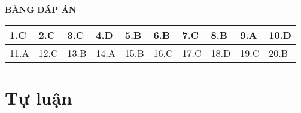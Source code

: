 \whiteBGstarEnd

\loigiai
{
	\begin{center}
		\textbf{BẢNG ĐÁP ÁN}
	\end{center}
	\begin{center}
		\begin{tabular}{|m{2.8em}|m{2.8em}|m{2.8em}|m{2.8em}|m{2.8em}|m{2.8em}|m{2.8em}|m{2.8em}|m{2.8em}|m{2.8em}|}
			\hline
			1.C  & 2.C  & 3.C  & 4.D  & 5.B  & 6.B  & 7.C  & 8.B  & 9.A  & 10.D  \\
			\hline
			11.A  & 12.C  & 13.B  & 14.A  & 15.B  & 16.C  & 17.C  & 18.D  & 19.C  & 20.B  \\
			\hline
		\end{tabular}
	\end{center}
}
\section{Tự luận}
